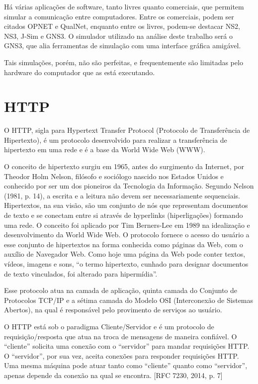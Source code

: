 	Há várias aplicações de software, tanto livres quanto comerciais, que permitem simular a comunicação entre computadores. Entre os comerciais, podem ser citados OPNET e QualNet, enquanto entre os livres, podem-se destacar NS2, NS3, J-Sim e GNS3. O simulador utilizado na análise deste trabalho será o GNS3, que alia ferramentas de simulação com uma interface gráfica amigável.

	Tais simulações, porém, não são perfeitas, e frequentemente são limitadas pelo hardware do computador que as está executando.


\section{HTTP}
\label{ch:http}

	O HTTP, sigla para Hypertext Transfer Protocol (Protocolo de Transferência de Hipertexto), é um protocolo desenvolvido para realizar a transferência de hipertexto em uma rede e é a base da World Wide Web (WWW).

	O conceito de hipertexto surgiu em 1965, antes do surgimento da Internet, por Theodor Holm Nelson, filósofo e sociólogo nascido nos Estados Unidos e conhecido por ser um dos pioneiros da Tecnologia da Informação. Segundo Nelson (1981, p. 14), a escrita e a leitura não devem ser necessariamente sequenciais. Hipertextos, na sua visão, são um conjunto de nós que representam documentos de texto e se conectam entre si através de hyperlinks (hiperligações) formando uma rede. O conceito foi aplicado por Tim Berners-Lee em 1989 na idealização e desenvolvimento da World Wide Web. O protocolo fornece o acesso do usuário a esse conjunto de hipertextos na forma conhecida como páginas da Web, com o auxílio de Navegador Web. Como hoje uma página da Web pode conter textos, vídeos, imagens e sons, “o termo hipertexto, cunhado para designar documentos de texto vinculados, foi alterado para hipermídia”. \cite{forouzanb}

Esse protocolo atua na camada de aplicação, quinta camada do Conjunto de Protocolos TCP/IP e a sétima camada do Modelo OSI (Interconexão de Sistemas Abertos), na qual é responsável pelo provimento de serviços ao usuário.

O HTTP está sob o paradigma Cliente/Servidor e é um protocolo de requisição/resposta que atua na troca de mensagens de maneira confiável. O “cliente” solicita uma conexão com o “servidor” para mandar requisições HTTP. O “servidor”, por sua vez, aceita conexões para responder requisições HTTP. Uma mesma máquina pode atuar tanto como “cliente” quanto como “servidor”, apenas depende da conexão na qual se encontra. [RFC 7230, 2014, p. 7]

